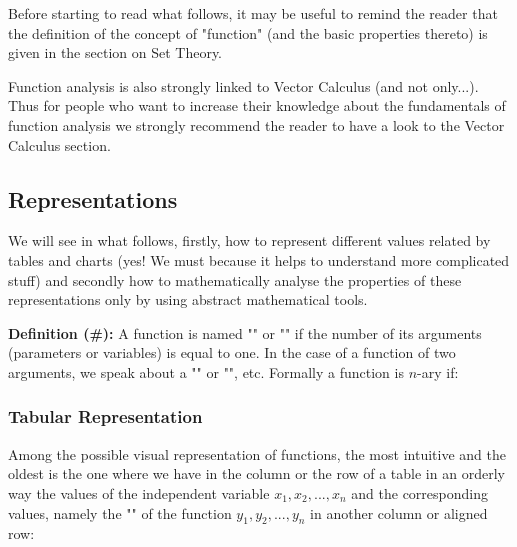 	\begin{tcolorbox}[title=Remark,colframe=black,arc=10pt]
Before starting to read what follows, it may be useful to remind the reader that the definition of the concept of "function" (and the basic properties thereto) is given in the section on Set Theory.
	\end{tcolorbox}	

	Function analysis is also strongly linked to Vector Calculus (and not only...). Thus for people who want to increase their knowledge about the fundamentals of function analysis we strongly recommend the reader to have a look to the Vector Calculus section.

\pagebreak
\subsection{Representations}

	We will see in what follows, firstly, how to represent different values related by tables and charts (yes! We must because it helps to understand more complicated stuff) and secondly how to mathematically analyse the properties of these representations only by using abstract mathematical tools.

	\textbf{Definition (\#\mydef):} A function is named "" or  "" if the number of its arguments (parameters or variables) is equal to one. In the case of a function of two arguments, we speak about a "" or "", etc. Formally a function is $n$-ary if:
	

\subsubsection{Tabular Representation}

Among the possible visual representation of functions, the most intuitive and the oldest is the one where we have in the column or the row of a table in an orderly way the values of the independent variable $x_1,x_2,...,x_n$ and the corresponding values, namely the "" of the function $y_1,y_2,...,y_n$ in another column or aligned row:

